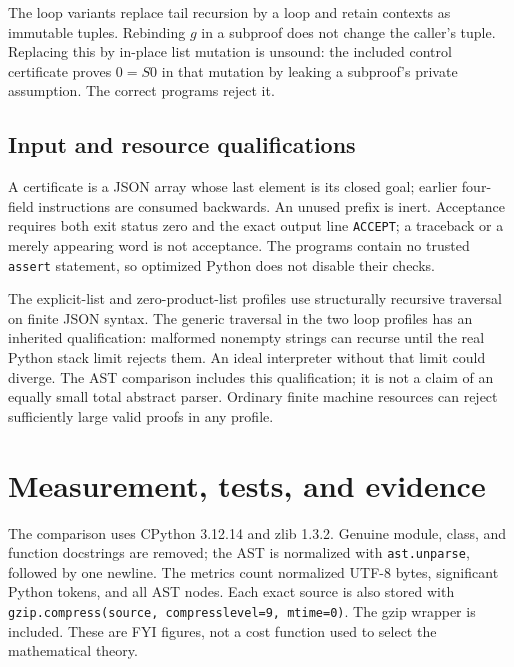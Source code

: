 \documentclass[11pt,letterpaper]{article}
\theoremstyle{definition}\newtheorem{definition}[theorem]{Definition}
\theoremstyle{remark}\newtheorem{remark}[theorem]{Remark}
\begin{document}
The loop variants replace tail recursion by a loop and retain contexts
as immutable tuples. Rebinding $g$ in a subproof does not change the
caller's tuple. Replacing this by in-place list mutation is unsound:
the included control certificate proves $0=S0$ in that mutation by
leaking a subproof's private assumption. The correct programs reject it.

\subsection{Input and resource qualifications}
A certificate is a JSON array whose last element is its closed goal;
earlier four-field instructions are consumed backwards. An unused prefix
is inert. Acceptance requires both exit status zero and the exact output
line \texttt{ACCEPT}; a traceback or a merely appearing word is not acceptance.
The programs contain no trusted \texttt{assert} statement, so optimized
Python does not disable their checks.

The explicit-list and zero-product-list profiles use structurally
recursive traversal on finite JSON syntax. The generic traversal in
the two loop profiles has an inherited qualification: malformed
nonempty strings can recurse until the real Python stack limit rejects
them. An ideal interpreter without that limit could diverge. The AST
comparison includes this qualification; it is not a claim of an equally
small total abstract parser. Ordinary finite machine resources can
reject sufficiently large valid proofs in any profile.

\section{Measurement, tests, and evidence}
\label{sec:evidence}
The comparison uses CPython 3.12.14 and zlib 1.3.2. Genuine module,
class, and function docstrings are removed; the AST is normalized with
\texttt{ast.unparse}, followed by one newline. The metrics count
normalized UTF-8 bytes, significant Python tokens, and all AST nodes.
Each exact source is also stored with
\texttt{gzip.compress(source, compresslevel=9, mtime=0)}.
The gzip wrapper is included. These are FYI figures, not a cost function
used to select the mathematical theory.
\end{document}
